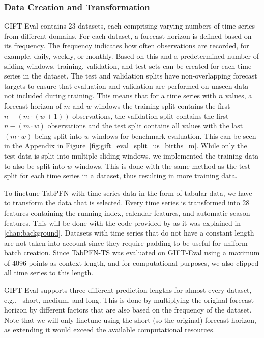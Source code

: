 \subsubsection{Data Creation and Transformation}
GIFT Eval contains 23 datasets, each comprising varying numbers of time series from different domains.
For each dataset, a forecast horizon is defined based on its frequency.
The frequency indicates how often observations are recorded, for example, daily, weekly, or monthly.\newline
Based on this and a predetermined number of sliding windows, training, validation, and test sets can be created for each time series in the dataset.
The test and validation splits have non-overlapping forecast targets to ensure that evaluation and validation are performed on unseen data not included during training.
This means that for a time series with $n$ values, a forecast horizon of $m$ and $w$ windows the training split contains the first $n-(m \cdot (w+1))$ observations, the validation split contains the first $n-(m \cdot w)$ observations and the test split contains all values with the last $(m \cdot w)$ being split into $w$ windows for benchmark evaluation.
This can be seen in the Appendix in Figure~\ref{fig:gift_eval_split_us_births_m}.\newline
While only the test data is split into multiple sliding windows, we implemented the training data to also be split into $w$ windows.
This is done with the same method as the test split for each time series in a dataset, thus resulting in more training data.

To finetune TabPFN with time series data in the form of tabular data, we have to transform the data that is selected.
Every time series is transformed into 28 features containing the running index, calendar features, and automatic season features.
This will be done with the code provided by \citet{hoo2025tables} as it was explained in \autoref{chap:background}.
\newline
Datasets with time series that do not have a constant length are not taken into account since they require padding to be useful for uniform batch creation.
\newline
Since TabPFN-TS was evaluated on GIFT-Eval using a maximum of 4096 points as context length, and for computational purposes, we also clipped all time series to this length.

GIFT-Eval supports three different prediction lengths for almost every dataset, e.g., \ short, medium, and long.
This is done by multiplying the original forecast horizon by different factors that are also based on the frequency of the dataset.
Note that we will only finetune using the short (so the original) forecast horizon, as extending it would exceed the available computational resources.

